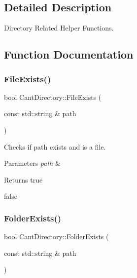 \subsection{Detailed Description}
Directory Related Helper Functions. 

\subsection{Function Documentation}
\mbox{\label{namespaceCantDirectory_a767d0a23dd8fbbd289bf99fa9b2e6b2c}} 
\subsubsection{\texorpdfstring{File\+Exists()}{FileExists()}}
{\footnotesize\ttfamily bool Cant\+Directory\+::\+File\+Exists (\begin{DoxyParamCaption}\item[{const std\+::string \&}]{path }\end{DoxyParamCaption})}



Checks if path exists and is a file. 


\begin{DoxyParams}{Parameters}
{\em path} & \\
\hline
\end{DoxyParams}
\begin{DoxyReturn}{Returns}
true 

false 
\end{DoxyReturn}
\mbox{\label{namespaceCantDirectory_a3fc8037d0d488b6ebd001aae47b474a8}} 
\subsubsection{\texorpdfstring{Folder\+Exists()}{FolderExists()}}
{\footnotesize\ttfamily bool Cant\+Directory\+::\+Folder\+Exists (\begin{DoxyParamCaption}\item[{const std\+::string \&}]{path }\end{DoxyParamCaption})}



